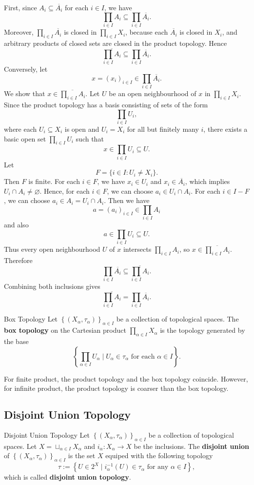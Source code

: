\documentclass{report}
\begin{document}
\begin{prf}
First, since $A_i\subseteq \overline{A_i}$ for each $i\in I$, we have
\[
\prod_{i\in I}A_i \subseteq \prod_{i\in I}\overline{A_i}.
\]
Moreover, $\prod_{i\in I}\overline{A_i}$ is closed in $\prod_{i\in I}X_i$,
because each $\overline{A_i}$ is closed in $X_i$, and arbitrary products of
closed sets are closed in the product topology. Hence
\[
\overline{\prod_{i\in I}A_i}
\subseteq
\prod_{i\in I}\overline{A_i}.
\]
Conversely, let
\[
x=(x_i)_{i\in I}\in \prod_{i\in I}\overline{A_i}.
\]
We show that $x\in \overline{\prod_{i\in I}A_i}$. Let $U$ be an open
neighbourhood of $x$ in $\prod_{i\in I}X_i$. Since the product topology has
a basis consisting of sets of the form
\[
\prod_{i\in I}U_i,
\]
where each $U_i\subseteq X_i$ is open and $U_i=X_i$ for all but finitely many
$i$, there exists a basic open set $\prod_{i\in I}U_i$
such that
\[
x\in \prod_{i\in I}U_i \subseteq U.
\]
Let
\[
F=\{i\in I : U_i\neq X_i\}.
\]
Then $F$ is finite. For each $i\in F$, we have $x_i\in U_i$ and
$x_i\in \overline{A_i}$, which implies $U_i\cap A_i\neq \varnothing$. Hence, for each $i\in F$, we can choose $a_i\in U_i\cap A_i$. For each $i\in I-F$, we can choose $a_i\in A_i=U_i\cap A_i$. Then we have
\[
a=(a_i)_{i\in I}\in \prod_{i\in I}A_i
\]
and also
\[
a\in \prod_{i\in I}U_i \subseteq U.
\]
Thus every open neighbourhood $U$ of $x$ intersects
$\prod_{i\in I}A_i$, so $x\in \overline{\prod_{i\in I}A_i}$. Therefore
\[
\prod_{i\in I}\overline{A_i}
\subseteq
\overline{\prod_{i\in I}A_i}.
\]
Combining both inclusions gives
\[
\overline{\prod_{i\in I} A_i}
=
\prod_{i\in I}\overline{A_i}.
\]
\end{prf}


\begin{definition}{Box Topology}{}
	Let $\left\{(X_\alpha,\tau_\alpha)\right\}_{\alpha\in I}$ be a collection of topological spaces. The \textbf{box topology} on the Cartesian product $\prod_{\alpha\in I}X_\alpha$ is the topology generated by the base
	\[
		\left\{\prod_{\alpha\in I}U_\alpha\mid U_\alpha\in \tau_\alpha\text{ for each }\alpha\in I\right\}.
	\]
\end{definition}

For finite product, the product topology and the box topology coincide. However, for infinite product, the product topology is coarser than the box topology.


\subsection{Disjoint Union Topology}
\begin{definition}{Disjoint Union Topology}{}
	Let $\left\{(X_\alpha,\tau_\alpha)\right\}_{\alpha\in I}$ be a collection of topological spaces. Let $X=\sqcup_{\alpha\in I}X_\alpha$ and $i_\alpha:X_\alpha\to X$ be the inclusions. The \textbf{disjoint union} of $\left\{(X_\alpha,\tau_\alpha)\right\}_{\alpha\in I}$ is the set $X$ equiped with the following topology
	\[
		\tau:=\left\{U\in 2^{X}\mid i_{\alpha}^{-1}(U)\in \tau_\alpha\text{ for any }\alpha\in I\right\},
	\]
	which is called \textbf{disjoint union topology}.
\end{definition}
\end{document}
